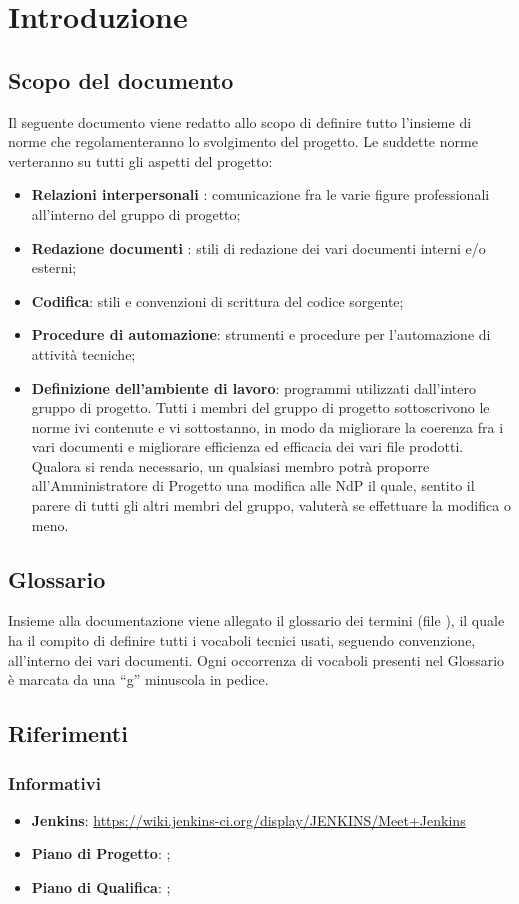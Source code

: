 \section{Introduzione}{
	\subsection{Scopo del documento}{
		Il seguente documento viene redatto allo scopo di definire tutto l’insieme di norme che regolamenteranno lo svolgimento del progetto. Le suddette norme verteranno su tutti gli aspetti del progetto:
		\begin{itemize}
        \item \textbf{Relazioni interpersonali} : comunicazione fra le varie figure professionali
		all’interno del gruppo di progetto;
		\item \textbf{Redazione documenti} : stili di redazione dei vari documenti interni e/o
		esterni;
		\item \textbf{Codifica}: stili e convenzioni di scrittura del codice sorgente;
		\item \textbf{Procedure di automazione}: strumenti e procedure per l’automazione
		di attività tecniche;
		\item \textbf{Definizione dell’ambiente di lavoro}: programmi utilizzati dall’intero
		gruppo di progetto.
		Tutti i membri del gruppo di progetto sottoscrivono le norme ivi contenute e vi	sottostanno, in modo da migliorare la coerenza fra i vari documenti e migliorare efficienza ed efficacia dei vari file prodotti.
		Qualora si renda necessario, un qualsiasi membro potrà proporre all’Amministratore di Progetto una modifica alle NdP il quale, sentito il parere di tutti gli altri membri del gruppo, valuterà se effettuare la modifica o meno.
		\end{itemize}
	 }
	\subsection{Glossario}{ 
	Insieme alla documentazione viene allegato il glossario dei termini (file \href{run:../../Esterni/\fGlossario}{\fEscapeGlossario}), il quale ha il compito di definire tutti i vocaboli tecnici usati, seguendo convenzione, all’interno dei vari documenti.  Ogni occorrenza di vocaboli presenti nel Glossario è marcata da una “g” minuscola in pedice.	
	}
}
   \subsection{Riferimenti}
     \subsubsection{Informativi}
     \begin{itemize}
       \item \textbf{Jenkins}: \url{https://wiki.jenkins-ci.org/display/JENKINS/Meet+Jenkins}
       \item \textbf{Piano di Progetto}: \href{run:../../Interni/\fPianoDiProgetto}{\fEscapePianoDiProgetto};
       \item \textbf{Piano di Qualifica}:  \href{run:../../Interni/\fPianoDiQualifica}{\fEscapePianoDiQualifica};
     \end{itemize}
        